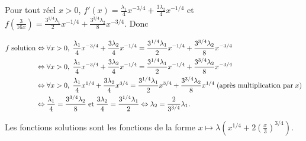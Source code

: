{{Pour tout réel $x>0$, $f'(x)= \frac{\lambda_1}{4}x^{-3/4}+ \frac{3\lambda_2}{4}x^{-1/4}$ et $f\left( \frac{3}{16x}\right)= \frac{3^{1/4}\lambda_1}{2}x^{-1/4}+ \frac{3^{3/4}\lambda_2}{8}x^{-3/4}$. Donc

\begin{align*}\ensuremath
f\;\text{solution}&\Leftrightarrow\forall x>0,\; \frac{\lambda_1}{4}x^{-3/4}+ \frac{3\lambda_2}{4}x^{-1/4}= \frac{3^{1/4}\lambda_1}{2}x^{-1/4}+ \frac{3^{3/4}\lambda_2}{8}x^{-3/4}\\
 &\Leftrightarrow\forall x>0,\; \frac{\lambda_1}{4}x^{-3/4}+ \frac{3\lambda_2}{4}x^{-1/4}= \frac{3^{1/4}\lambda_1}{2}x^{-1/4}+ \frac{3^{3/4}\lambda_2}{8}x^{-3/4}\\
 &\Leftrightarrow\forall x>0,\; \frac{\lambda_1}{4}x^{1/4}+ \frac{3\lambda_2}{4}x^{3/4}= \frac{3^{1/4}\lambda_1}{2}x^{3/4}+ \frac{3^{3/4}\lambda_2}{8}x^{1/4}\;(\text{après multiplication par}\;x)\\
 &\Leftrightarrow \frac{\lambda_1}{4}= \frac{3^{3/4}\lambda_2}{8}\;\text{et}\; \frac{3\lambda_2}{4}= \frac{3^{1/4}\lambda_1}{2}\Leftrightarrow\lambda_2= \frac{2}{3^{3/4}}\lambda_1.
\end{align*}

Les fonctions solutions sont les fonctions de la forme $x\mapsto\lambda\left(x^{1/4}+2\left( \frac{x}{3}\right)^{3/4}\right)$.
}
}
